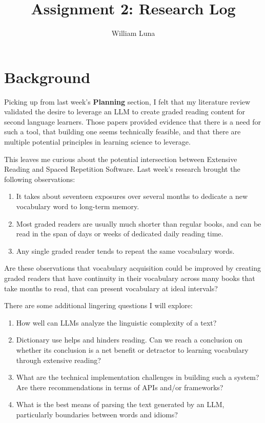 \documentclass[
	letterpaper, %
]{jdf}
\author{William Luna}
\title{Assignment 2: Research Log}
\begin{document}

\maketitle

\section{Background}
Picking up from last week's \textbf{Planning} section, I felt that my literature review validated the desire to leverage an LLM to create graded reading content for second language learners. Those papers provided evidence that there is a need for such a tool, that building one seems technically feasible, and that there are multiple potential principles in learning science to leverage.

This leaves me curious about the potential intersection between Extensive Reading and Spaced Repetition Software. Last week's research brought the following observations:

\begin{enumerate}
    \item It takes about seventeen exposures over several months to dedicate a new vocabulary word to long-term memory.
    \item Most graded readers are usually much shorter than regular books, and can be read in the span of days or weeks of dedicated daily reading time.
    \item Any single graded reader tends to repeat the same vocabulary words.
\end{enumerate}

Are these observations that vocabulary acquisition could be improved by creating graded readers that have continuity in their vocabulary across many books that take months to read, that can present vocabulary at ideal intervals?

There are some additional lingering questions I will explore:

\begin{enumerate}
    \item How well can LLMs analyze the linguistic complexity of a text?
    \item Dictionary use helps and hinders reading. Can we reach a conclusion on whether its conclusion is a net benefit or detractor to learning vocabulary through extensive reading?
    \item What are the technical implementation challenges in building such a system? Are there recommendations in terms of APIs and/or frameworks?
    \item What is the best means of parsing the text generated by an LLM, particularly boundaries between words and idioms?
\end{enumerate}
\end{document}
